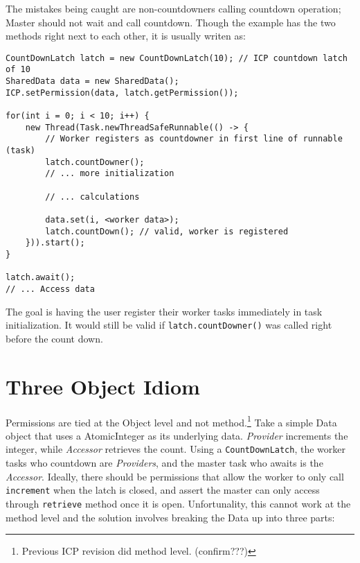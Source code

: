 \documentclass[9pt, twoside, a4paper]{article}
\begin{document}
    The mistakes being caught are non-countdowners calling countdown operation; Master should not wait
    and call countdown. Though the example has the two methods right next to each other, it is usually
    writen as:

    \begin{lstlisting}
CountDownLatch latch = new CountDownLatch(10); // ICP countdown latch of 10
SharedData data = new SharedData();
ICP.setPermission(data, latch.getPermission());

for(int i = 0; i < 10; i++) {
    new Thread(Task.newThreadSafeRunnable(() -> {
        // Worker registers as countdowner in first line of runnable (task)
        latch.countDowner();
        // ... more initialization

        // ... calculations

        data.set(i, <worker data>);
        latch.countDown(); // valid, worker is registered
    })).start();
}

latch.await();
// ... Access data
    \end{lstlisting}

    The goal is having the \gls{user} register their worker tasks immediately in task initialization. It would still be
    valid if \lstinline{latch.countDowner()} was called right before the count down.

    \section{Three Object Idiom} \label{sec:three-object-idiom}
    Permissions are tied at the Object level and not method.\footnote{Previous ICP revision did method level. (confirm???)}
    Take a simple Data object that uses a AtomicInteger as its underlying data. \textit{Provider} increments the integer,
    while \textit{Accessor} retrieves the count. Using a \lstinline{CountDownLatch}, the worker tasks who countdown
    are \textit{Providers}, and the master task who awaits is the \textit{Accessor}. Ideally, there should be permissions
    that allow the worker to only call \lstinline{increment} when the latch is closed, and assert the master can only
    access through \lstinline{retrieve} method once it is open. Unfortunality, this cannot work at the method level and the
    solution involves breaking the Data up into three parts:

\end{document}
